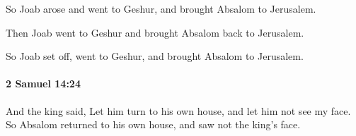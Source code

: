 			\begin{versebox}
					\item[BHS] 
					\item[ASV] So Joab arose and went to Geshur, and brought Absalom to Jerusalem.
					\item[NIV] Then Joab went to Geshur and brought Absalom back to Jerusalem.
					\item[NRSV] So Joab set off, went to Geshur, and brought Absalom to Jerusalem.
			\end{versebox}

		\paragraph{2 Samuel 14:24} %
			\label{2SAMUEL-14-24}

			And the king said, Let him turn to his own house, and let him not see my face. So Absalom returned to his own house, and saw not the king’s face.

